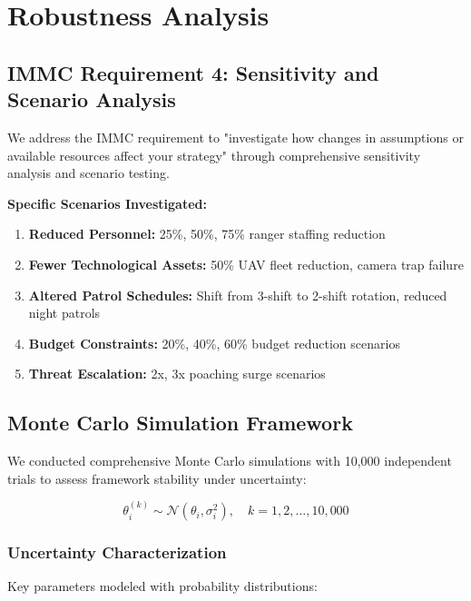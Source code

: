 \section{Robustness Analysis}

\subsection*{IMMC Requirement 4: Sensitivity and Scenario Analysis}

We address the IMMC requirement to "investigate how changes in assumptions or available resources affect your strategy" through comprehensive sensitivity analysis and scenario testing.

\textbf{Specific Scenarios Investigated:}

\begin{enumerate}
    \item \textbf{Reduced Personnel:} 25\%, 50\%, 75\% ranger staffing reduction
    \item \textbf{Fewer Technological Assets:} 50\% UAV fleet reduction, camera trap failure
    \item \textbf{Altered Patrol Schedules:} Shift from 3-shift to 2-shift rotation, reduced night patrols
    \item \textbf{Budget Constraints:} 20\%, 40\%, 60\% budget reduction scenarios
    \item \textbf{Threat Escalation:} 2x, 3x poaching surge scenarios
\end{enumerate}

\subsection{Monte Carlo Simulation Framework}

We conducted comprehensive Monte Carlo simulations with 10,000 independent trials to assess framework stability under uncertainty:

\begin{equation}
\theta_i^{(k)} \sim \mathcal{N}(\theta_i, \sigma_i^2), \quad k = 1, 2, \ldots, 10,000
\label{eq:monte_carlo_sampling}
\end{equation}

\subsubsection{Uncertainty Characterization}

Key parameters modeled with probability distributions:

